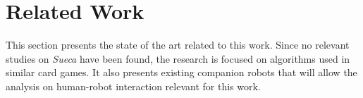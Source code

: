 \section{Related Work} \label{sec:related-work}

This section presents the state of the art related to this work.
Since no relevant studies on \emph{Sueca} have been found, the research is focused on algorithms used in similar card games.
It also presents existing companion robots that will allow the analysis on human-robot interaction relevant for this work.




